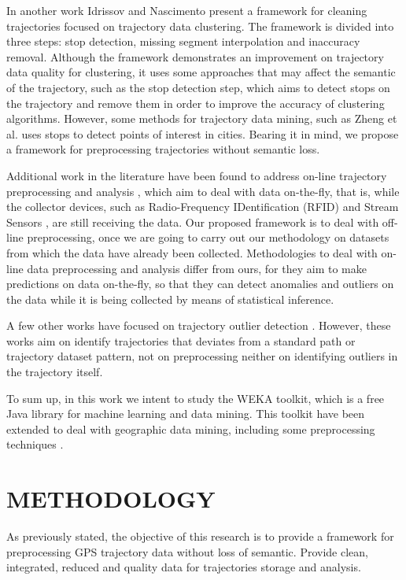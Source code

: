 \documentclass[a4paper,12pt]{article}
\begin{document}
In another work Idrissov and Nascimento \cite{idrissov2012} present a framework for cleaning trajectories focused on trajectory data clustering. The framework is divided into three steps: stop detection, missing segment interpolation and inaccuracy removal. Although the framework demonstrates an improvement on trajectory data quality for clustering, it uses some approaches that may affect the semantic of the trajectory, such as the stop detection step, which aims to detect stops on the trajectory and remove them in order to improve the accuracy of clustering algorithms. However, some methods for trajectory data mining, such as Zheng et al. \cite{zheng2009} uses stops to detect points of interest in cities. Bearing it in mind, we propose a framework for preprocessing trajectories without semantic loss.

Additional work in the literature have been found to address on-line trajectory preprocessing and analysis \cite{fazzinga2014}\cite{lange2008}\cite{pumpichet2012}, which aim to deal with data on-the-fly, that is, while the collector devices, such as Radio-Frequency IDentification (RFID) \cite{fazzinga2014} and Stream Sensors \cite{pumpichet2012}, are still receiving the data. Our proposed framework is to deal with off-line preprocessing, once we are going to carry out our methodology on datasets from which the data have already been collected. Methodologies to deal with on-line data preprocessing and analysis differ from ours, for they aim to make predictions on data on-the-fly, so that they can detect anomalies and outliers on the data while it is being collected  by means of statistical inference.

A few other works have focused on trajectory outlier detection \cite{deAquino2013}\cite{fontes2013} \cite{gupta2014}\cite{lee2008}. However, these works aim on identify trajectories that deviates from a standard path or trajectory dataset pattern, not on preprocessing neither on identifying outliers in the trajectory itself.

To sum up, in this work we intent to study the WEKA toolkit, which is a free Java library for machine learning and data mining. This toolkit have been extended to deal with geographic data mining, including some preprocessing techniques \cite{bogorny2006weka}.

\section{METHODOLOGY}\label{sec:methodology}
As previously stated, the objective of this research is to provide a framework for preprocessing GPS trajectory data without loss of semantic. Provide clean, integrated, reduced and quality data for trajectories storage and analysis.
\end{document}
